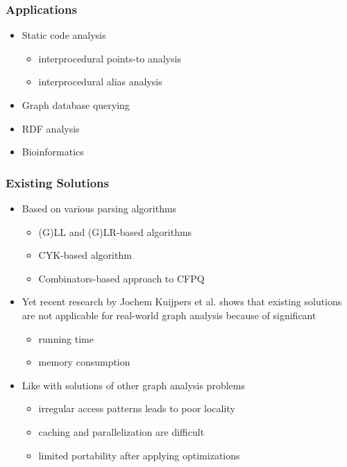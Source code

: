 \documentclass[xcolor=table,aspectratio=169]{beamer}
\begin{document}
  \begin{frame}[fragile] \frametitle{Applications}
    \begin{itemize}
      \item Static code analysis
       \begin{itemize}
      	\item interprocedural points-to analysis
      	\item interprocedural alias analysis
      \end{itemize}
      \item Graph database querying
      \item RDF analysis
      \item Bioinformatics
    \end{itemize}
  \end{frame}

\begin{frame}[fragile] \frametitle{Existing Solutions}
	\begin{itemize}
		\item Based on various parsing algorithms
		\begin{itemize}
			\item (G)LL and (G)LR-based algorithms%
			\item CYK-based algorithm%
			\item Combinators-based approach to CFPQ%
		\end{itemize}
		\item Yet recent research by Jochem
		Kuijpers et al. shows that existing solutions are not applicable
		for real-world graph analysis because of significant
		\begin{itemize}
			\item running time
			\item memory consumption
		\end{itemize}
		\item Like with solutions of other graph analysis problems
		\begin{itemize}
			\item irregular access patterns leads to poor locality
			\item caching and parallelization are difficult
			\item limited portability after applying optimizations
		\end{itemize}
	\end{itemize}
\end{frame}
\end{document}

